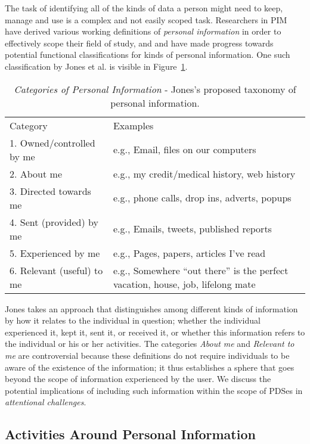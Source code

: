 \documentclass[graybox]{svmult}
\begin{document}
The task of identifying all of the kinds of data a person might need to keep, manage and use is a complex and not easily scoped task.  Researchers in PIM have derived various working definitions of \emph{personal information} in order to effectively scope their field of study, and and have made progress towards potential functional classifications for kinds of personal information. One such classification by Jones et al. \cite{kftf} is visible in Figure~\ref{fig:jonestype}.

\begin{table}
\begin{tabular}{p{4cm} p{8cm}}
Category & Examples \\
1. Owned/controlled by me & e.g., Email, files on our computers  \\
2. About me	& e.g., my credit/medical history, web history \\
3. Directed towards me & e.g., phone calls, drop ins, adverts, popups \\
4. Sent (provided) by me & e.g.,  Emails, tweets, published reports  \\
5. Experienced by me & e.g.,  Pages, papers, articles I’ve read \\
6. Relevant (useful) to me	& e.g.,  Somewhere ``out there'' is the perfect vacation, house, job, lifelong mate \\
\end{tabular}
\caption{\emph{Categories of Personal Information} - Jones's proposed taxonomy of personal information. \cite{kftf}}
\label{fig:jonestype}
\end{table}

Jones takes an approach that distinguishes among different kinds of information by how it relates to the individual in question; whether the individual experienced it, kept it, sent it, or received it, or whether this information refers to the individual or his or her activities.  The categories \emph{About me} and \emph{Relevant to me} are controversial because these definitions do not require individuals to be aware of the existence of the information; it thus establishes a sphere that goes beyond the scope of information experienced by the user.  We discuss the potential implications of including such information within the scope of PDSes in \emph{attentional challenges}. 


\subsection{Activities Around Personal Information}
\end{document}
